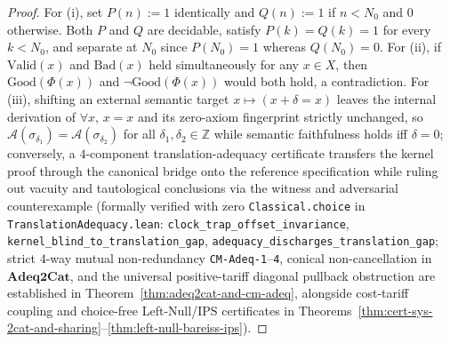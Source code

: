 \documentclass[11pt]{article}
\theoremstyle{plain}
\theoremstyle{definition}
\begin{document}
\begin{proof}
For (i), set $P(n) := 1$ identically and $Q(n) := 1$ if $n < N_0$ and $0$ otherwise. Both $P$ and $Q$ are decidable, satisfy $P(k) = Q(k) = 1$ for every $k < N_0$, and separate at $N_0$ since $P(N_0) = 1$ whereas $Q(N_0) = 0$. For (ii), if $\mathrm{Valid}(x)$ and $\mathrm{Bad}(x)$ held simultaneously for any $x \in X$, then $\mathrm{Good}(\Phi(x))$ and $\neg\mathrm{Good}(\Phi(x))$ would both hold, a contradiction. For (iii), shifting an external semantic target $x \mapsto (x + \delta = x)$ leaves the internal derivation of $\forall x,\, x = x$ and its zero-axiom fingerprint strictly unchanged, so $\mathcal{A}(\sigma_{\delta_1}) = \mathcal{A}(\sigma_{\delta_2})$ for all $\delta_1, \delta_2 \in \mathbb{Z}$ while semantic faithfulness holds iff $\delta = 0$; conversely, a $4$-component translation-adequacy certificate transfers the kernel proof through the canonical bridge onto the reference specification while ruling out vacuity and tautological conclusions via the witness and adversarial counterexample (formally verified with zero \texttt{Classical.choice} in \texttt{TranslationAdequacy.lean}: \texttt{clock\_\allowbreak trap\_\allowbreak offset\_\allowbreak invariance}, \texttt{kernel\_\allowbreak blind\_\allowbreak to\_\allowbreak translation\_\allowbreak gap}, \texttt{adequacy\_\allowbreak discharges\_\allowbreak translation\_\allowbreak gap}; strict $4$-way mutual non-redundancy \texttt{CM-Adeq-1}--\texttt{4}, conical non-cancellation in $\mathbf{Adeq2Cat}$, and the universal positive-tariff diagonal pullback obstruction are established in Theorem~\ref{thm:adeq2cat-and-cm-adeq}, alongside cost-tariff coupling and choice-free Left-Null/$\mathrm{IPS}$ certificates in Theorems~\ref{thm:cert-sys-2cat-and-sharing}--\ref{thm:left-null-bareiss-ips}).
\end{proof}
\end{document}
